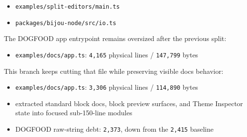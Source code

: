 \begin{itemize}
\item
  \texttt{e\allowbreak{}x\allowbreak{}a\allowbreak{}m\allowbreak{}p\allowbreak{}l\allowbreak{}e\allowbreak{}s\allowbreak{}/\allowbreak{}s\allowbreak{}p\allowbreak{}l\allowbreak{}i\allowbreak{}t\allowbreak{}-\allowbreak{}e\allowbreak{}d\allowbreak{}i\allowbreak{}t\allowbreak{}o\allowbreak{}r\allowbreak{}s\allowbreak{}/\allowbreak{}m\allowbreak{}a\allowbreak{}i\allowbreak{}n\allowbreak{}.\allowbreak{}t\allowbreak{}s}
\item
  \texttt{p\allowbreak{}a\allowbreak{}c\allowbreak{}k\allowbreak{}a\allowbreak{}g\allowbreak{}e\allowbreak{}s\allowbreak{}/\allowbreak{}b\allowbreak{}i\allowbreak{}j\allowbreak{}o\allowbreak{}u\allowbreak{}-\allowbreak{}n\allowbreak{}o\allowbreak{}d\allowbreak{}e\allowbreak{}/\allowbreak{}s\allowbreak{}r\allowbreak{}c\allowbreak{}/\allowbreak{}i\allowbreak{}o\allowbreak{}.\allowbreak{}t\allowbreak{}s}
\end{itemize}

The DOGFOOD app entrypoint remains oversized after the previous split:

\begin{itemize}
\tightlist
\item
  \texttt{e\allowbreak{}x\allowbreak{}a\allowbreak{}m\allowbreak{}p\allowbreak{}l\allowbreak{}e\allowbreak{}s\allowbreak{}/\allowbreak{}d\allowbreak{}o\allowbreak{}c\allowbreak{}s\allowbreak{}/\allowbreak{}a\allowbreak{}p\allowbreak{}p\allowbreak{}.\allowbreak{}t\allowbreak{}s}: \texttt{4\allowbreak{},\allowbreak{}1\allowbreak{}6\allowbreak{}5} physical lines / \texttt{1\allowbreak{}4\allowbreak{}7\allowbreak{},\allowbreak{}7\allowbreak{}9\allowbreak{}9} bytes
\end{itemize}

This branch keeps cutting that file while preserving visible docs behavior:

\begin{itemize}
\tightlist
\item
  \texttt{e\allowbreak{}x\allowbreak{}a\allowbreak{}m\allowbreak{}p\allowbreak{}l\allowbreak{}e\allowbreak{}s\allowbreak{}/\allowbreak{}d\allowbreak{}o\allowbreak{}c\allowbreak{}s\allowbreak{}/\allowbreak{}a\allowbreak{}p\allowbreak{}p\allowbreak{}.\allowbreak{}t\allowbreak{}s}: \texttt{3\allowbreak{},\allowbreak{}3\allowbreak{}0\allowbreak{}6} physical lines / \texttt{1\allowbreak{}1\allowbreak{}4\allowbreak{},\allowbreak{}8\allowbreak{}9\allowbreak{}0} bytes
\item
  extracted standard block docs, block preview surfaces, and Theme Inspector state into focused sub-150-line modules
\item
  DOGFOOD raw-string debt: \texttt{2\allowbreak{},\allowbreak{}3\allowbreak{}7\allowbreak{}3}, down from the \texttt{2\allowbreak{},\allowbreak{}4\allowbreak{}1\allowbreak{}5} baseline
\end{itemize}

